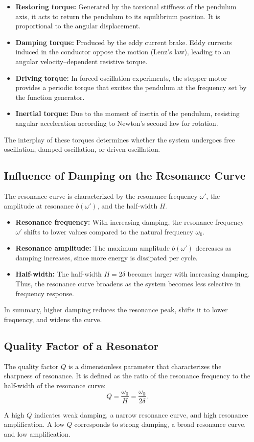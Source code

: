 \begin{itemize}
    \item \textbf{Restoring torque:} Generated by the torsional stiffness of the pendulum axis, it acts to return the pendulum to its equilibrium position. It is proportional to the angular displacement.
    \item \textbf{Damping torque:} Produced by the eddy current brake. Eddy currents induced in the conductor oppose the motion (Lenz’s law), leading to an angular velocity–dependent resistive torque.
    \item \textbf{Driving torque:} In forced oscillation experiments, the stepper motor provides a periodic torque that excites the pendulum at the frequency set by the function generator.
    \item \textbf{Inertial torque:} Due to the moment of inertia of the pendulum, resisting angular acceleration according to Newton’s second law for rotation.
\end{itemize}

The interplay of these torques determines whether the system undergoes free oscillation, damped oscillation, or driven oscillation.

\subsection*{Influence of Damping on the Resonance Curve}
The resonance curve is characterized by the resonance frequency $\omega'$, the amplitude at resonance $b(\omega')$, and the half-width $H$.

\begin{itemize}
    \item \textbf{Resonance frequency:} With increasing damping, the resonance frequency $\omega'$ shifts to lower values compared to the natural frequency $\omega_0$.
    \item \textbf{Resonance amplitude:} The maximum amplitude $b(\omega')$ decreases as damping increases, since more energy is dissipated per cycle.
    \item \textbf{Half-width:} The half-width $H = 2 \delta$ becomes larger with increasing damping. Thus, the resonance curve broadens as the system becomes less selective in frequency response.
\end{itemize}

In summary, higher damping reduces the resonance peak, shifts it to lower frequency, and widens the curve.

\subsection*{Quality Factor of a Resonator}
The quality factor $Q$ is a dimensionless parameter that characterizes the sharpness of resonance. It is defined as the ratio of the resonance frequency to the half-width of the resonance curve:
\begin{equation}
Q = \frac{\omega_0}{H} = \frac{\omega_0}{2 \delta}.
\end{equation}

A high $Q$ indicates weak damping, a narrow resonance curve, and high resonance amplification. A low $Q$ corresponds to strong damping, a broad resonance curve, and low amplification.
